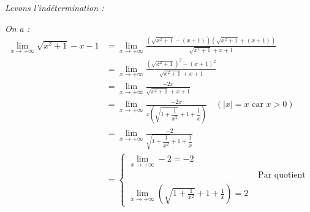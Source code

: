 \documentclass[12pt,a4paper]{article}
\begin{document}
\begin{enumerate}
    \textit{Levons l'indétermination :}
    
    \textit{On a :}
    \begin{align*}
        \displaystyle \lim_{x \to +\infty} \sqrt{x^2 + 1} - x - 1 &= \lim_{x \to +\infty} \frac{(\sqrt{x^2 + 1} - (x + 1))(\sqrt{x^2 + 1} + (x + 1))}{\sqrt{x^2 + 1} + x + 1} \\
        &= \lim_{x \to +\infty} \frac{(\sqrt{x^2 + 1})^2 - (x + 1)^2}{\sqrt{x^2 + 1} + x + 1} \\
        &= \lim_{x \to +\infty} \frac{-2x}{\sqrt{x^2 + 1} + x + 1} \\
        &= \lim_{x \to +\infty} \frac{-2x}{x \left( \sqrt{1 + \dfrac{1}{x^2}} + 1 + \dfrac{1}{x} \right)} \quad (|x| = x \text{ car } x > 0) \\
        &= \lim_{x \to +\infty} \frac{-2}{\sqrt{1 + \dfrac{1}{x^2}} + 1 + \dfrac{1}{x}} \\
        &= \begin{cases}
    \displaystyle \lim_{x \to +\infty} -2 = -2 \\[3mm]
    &\text{ Par quotient }\\
    \displaystyle \lim_{x \to +\infty} \left( \sqrt{1 + \frac{1}{x^2}} + 1 + \frac{1}{x} \right) = 2
    \end{cases}
    \end{align*}
    
    \vspace{0.2cm}
    
     
\end{enumerate}
\end{document}
